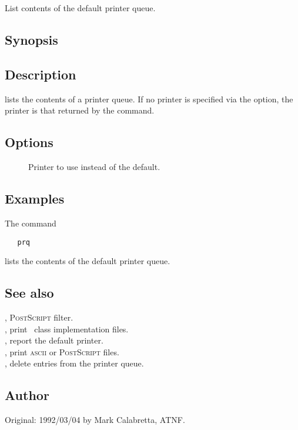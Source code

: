 \newpage
\section{}
\label{prq}



List contents of the default printer queue.

\subsection*{Synopsis}

\begin{synopsis}
\end{synopsis}

\subsection*{Description}

 lists the contents of a printer queue.  If no printer is specified
via the  option, the printer is that returned by the 
command.

\subsection*{Options}

\begin{description}
\item[]
   Printer to use instead of the default.
\end{description}

\subsection*{Examples}

The command

\begin{verbatim}
   prq
\end{verbatim}

\noindent
lists the contents of the default printer queue.

\subsection*{See also}

, \textsc{PostScript} filter.\\
, print \aipspp\ class implementation files.\\
, report the default printer.\\
, print \textsc{ascii} or \textsc{PostScript} files.\\
, delete entries from the printer queue.

\subsection*{Author}

Original: 1992/03/04 by Mark Calabretta, ATNF.
